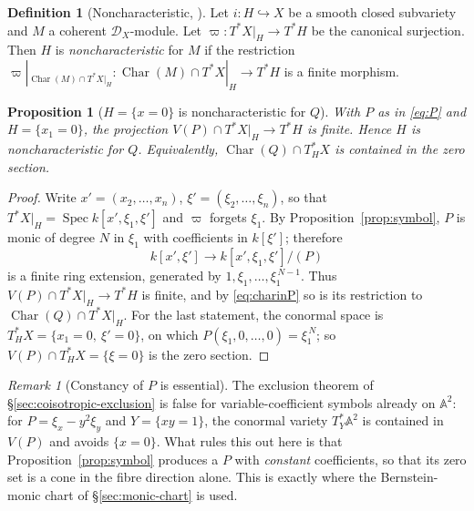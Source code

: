 \documentclass[11pt]{article}
\theoremstyle{plain}
\newtheorem{proposition}[theorem]{Proposition}
\theoremstyle{definition}
\newtheorem{definition}[theorem]{Definition}
\theoremstyle{remark}
\newtheorem{remark}[theorem]{Remark}
\theoremstyle{plain}
\newcommand{\Char}{\operatorname{Char}}
\newcommand{\Spec}{\operatorname{Spec}}
\newcommand{\bbA}{\mathbb{A}}
\begin{document}
\begin{definition}[Noncharacteristic, {\cite[Def.~15.6]{Schnell}}]\label{def:noncar}
Let $i\colon H\hookrightarrow X$ be a smooth closed subvariety and $M$ a
coherent $\mathcal D_X$-module. Let
$\varpi\colon T^*X|_H\to T^*H$ be the canonical surjection. Then $H$ is
\emph{noncharacteristic} for $M$ if the restriction
$\varpi|_{\Char(M)\cap T^*X|_H}\colon\Char(M)\cap T^*X|_H\to T^*H$ is a finite
morphism.
\end{definition}

\begin{proposition}[$H=\{x=0\}$ is noncharacteristic for $Q$]\label{prop:noncar}
With $P$ as in \eqref{eq:P} and $H=\{x_1=0\}$, the projection
$V(P)\cap T^*X|_H\to T^*H$ is finite. Hence $H$ is noncharacteristic for $Q$.
Equivalently, $\Char(Q)\cap T^*_HX$ is contained in the zero section.
\end{proposition}

\begin{proof}
Write $x'=(x_2,\dots,x_n)$, $\xi'=(\xi_2,\dots,\xi_n)$, so that
$T^*X|_H=\Spec k[x',\xi_1,\xi']$ and $\varpi$ forgets $\xi_1$. By
Proposition~\ref{prop:symbol}, $P$ is monic of degree $N$ in $\xi_1$ with
coefficients in $k[\xi']$; therefore
\[
  k[x',\xi']\longrightarrow k[x',\xi_1,\xi']/(P)
\]
is a finite ring extension, generated by $1,\xi_1,\dots,\xi_1^{\,N-1}$. Thus
$V(P)\cap T^*X|_H\to T^*H$ is finite, and by \eqref{eq:charinP} so is its
restriction to $\Char(Q)\cap T^*X|_H$. For the last statement, the conormal
space is $T^*_HX=\{x_1=0,\ \xi'=0\}$, on which
$P(\xi_1,0,\dots,0)=\xi_1^{\,N}$; so $V(P)\cap T^*_HX=\{\xi=0\}$ is the zero
section.
\end{proof}

\begin{remark}[Constancy of $P$ is essential]\label{rem:boundary}
The exclusion theorem of \S\ref{sec:coisotropic-exclusion} is false for
variable-coefficient symbols already on $\bbA^2$: for
$P=\xi_x-y^2\xi_y$ and $Y=\{xy=1\}$, the conormal variety $T^*_Y\bbA^2$ is
contained in $V(P)$ and avoids $\{x=0\}$. What rules this out here is that
Proposition~\ref{prop:symbol} produces a $P$ with \emph{constant} coefficients,
so that its zero set is a cone in the fibre direction alone. This is exactly
where the Bernstein-monic chart of \S\ref{sec:monic-chart} is used.
\end{remark}
\end{document}
